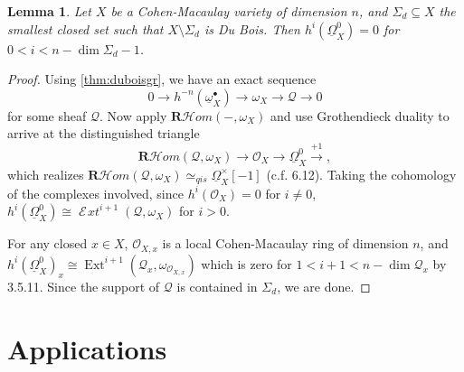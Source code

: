\documentclass[proquest]{uwthesis}[2014/11/13]
\newtheorem{lemma}[theorem]{Lemma}
\theoremstyle{definition}
\DeclareMathOperator{\Ext}{Ext}
\DeclareMathOperator{\cExt}{\mathscr{E} \! \textit{xt}}
\newcommand{\cHom}{\mathcal{H} \textit{om}}
\newcommand{\OO}{\mathcal{O}}
\newcommand{\qis}{\simeq_{qis}}
\newcommand{\bR}{\textbf{R}}
\newcommand{\DB}{\underline{\Omega}}
\newcommand{\db}{\underline{\omega}^\bullet}
\begin{document}
\begin{lemma}
	Let $X$ be a Cohen-Macaulay variety of dimension $n$, and $\Sigma_d \subseteq X$ the smallest closed set such that $X \setminus \Sigma_d$ is Du Bois.
	Then $h^i (\DB_X^0) = 0$ for $0 < i < n - \dim \Sigma_d - 1$.
\end{lemma}
\begin{proof}
	Using \ref{thm:duboisgr}, we have an exact sequence
	\[
		0 \rightarrow h^{-n}(\db_X) \rightarrow \omega_X \rightarrow \mathscr{Q} \rightarrow 0
	\]
	for some sheaf $\mathscr{Q}$.
	Now apply $\bR \cHom (-, \omega_X)$ and use Grothendieck duality to arrive at the distinguished triangle
	\[
		\bR \cHom(\mathscr{Q}, \omega_X) \rightarrow \OO_X \rightarrow \DB_X^0 \xrightarrow{+1},
	\]
	which realizes $\bR \cHom(\mathscr{Q}, \omega_X) \qis \DB_X^\times[-1]$ (c.f. \cite{Kollar2013} 6.12).
	Taking the cohomology of the complexes involved, since $h^i(\OO_X) = 0$ for $i \neq 0$, $h^i(\DB_X^0) \cong \cExt^{i+1}(\mathscr{Q}, \omega_X)$ for $i > 0$.
	
	For any closed $x \in X$, $\OO_{X,x}$ is a local Cohen-Macaulay ring of dimension $n$, and $h^i(\DB_X^0)_x \cong \Ext^{i+1}(\mathscr{Q}_x, \omega_{\OO_{X,x}})$ which is zero for $1 < i+1 < n - \dim \mathscr{Q}_x$ by \cite{Bruns1993} 3.5.11. Since the support of $\mathscr{Q}$ is contained in $\Sigma_d$, we are done.
\end{proof}

\chapter{Applications}
\label{chp:applications}
\end{document}
